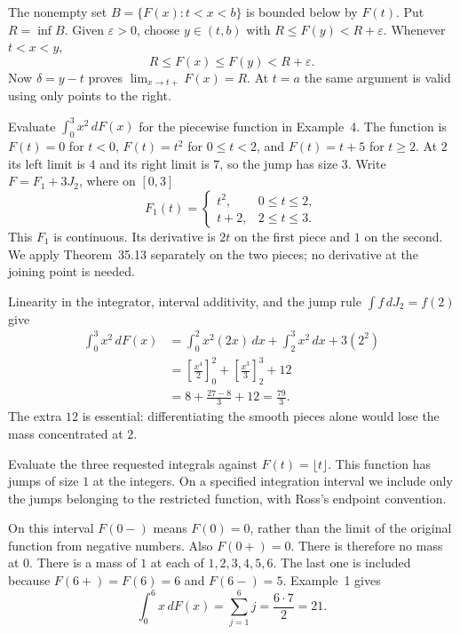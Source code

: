 \step{(b) Approach $t\in[a,b)$ from the right.}
The nonempty set $B=\{F(x):t<x<b\}$ is bounded below by $F(t)$.
Put $R=\inf B$. Given $\varepsilon>0$, choose $y\in(t,b)$
with $R\le F(y)<R+\varepsilon$. Whenever $t<x<y$,
\[
 R\le F(x)\le F(y)<R+\varepsilon.
\]
Now $\delta=y-t$ proves $\lim_{x\to t+}F(x)=R$.
At $t=a$ the same argument is valid using only points to the right.

\goal Evaluate $\int_0^3x^2\,dF(x)$ for the piecewise function in
Example~4.
The function is $F(t)=0$ for $t<0$, $F(t)=t^2$ for $0\le t<2$,
and $F(t)=t+5$ for $t\ge2$. At $2$ its left limit is $4$ and its
right limit is $7$, so the jump has size $3$.
Write $F=F_1+3J_2$, where on $[0,3]$
\[
 F_1(t)=\begin{cases}t^2,&0\le t\le2,\\t+2,&2\le t\le3.\end{cases}
\]
This $F_1$ is continuous. Its derivative is $2t$ on the first
piece and $1$ on the second. We apply Theorem~35.13 separately on
the two pieces; no derivative at the joining point is needed.

Linearity in the integrator, interval additivity, and the jump rule
$\int f\,dJ_2=f(2)$ give
\begin{align*}
 \int_0^3x^2\,dF(x)
 &=\int_0^2x^2(2x)\,dx+\int_2^3x^2\,dx+3(2^2)\\
 &=\left[\frac{x^4}{2}\right]_0^2
   +\left[\frac{x^3}{3}\right]_2^3+12\\
 &=8+\frac{27-8}{3}+12=\frac{79}{3}.
\end{align*}
The extra $12$ is essential: differentiating the smooth pieces alone
would lose the mass concentrated at $2$.

\goal Evaluate the three requested integrals against $F(t)=\lfloor t\rfloor$.
\idea This function has jumps of size $1$ at the integers. On a
specified integration interval we include only the jumps belonging
to the restricted function, with Ross's endpoint convention.

On this interval $F(0-)$ means $F(0)=0$, rather than the limit of
the original function from negative numbers. Also $F(0+)=0$.
There is therefore no mass at $0$. There is a mass of $1$ at
each of $1,2,3,4,5,6$. The last one is included because
$F(6+)=F(6)=6$ and $F(6-)=5$. Example~1 gives
\[
 \int_0^6x\,dF(x)=\sum_{j=1}^6j=\frac{6\cdot7}{2}=21.
\]

